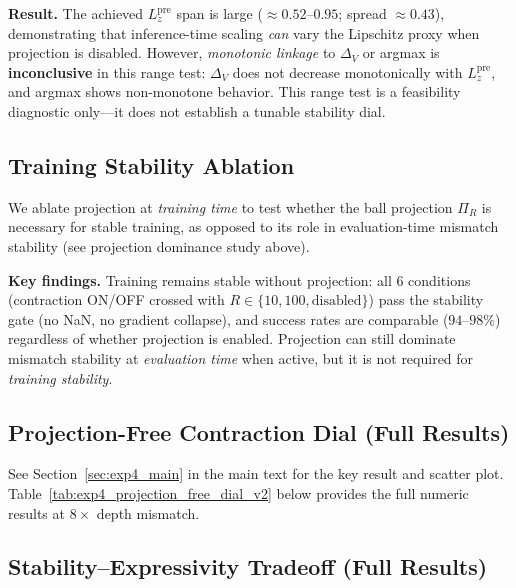 \documentclass{article}
\theoremstyle{plain}
\theoremstyle{definition}
\theoremstyle{remark}
\newcommand{\shortonly}[1]{#1}
\newcommand{\shortonly}[1]{}
\begin{document}


\textbf{Result.}
The achieved $L^{\mathrm{pre}}_z$ span is large ($\approx 0.52$--$0.95$; spread $\approx 0.43$), demonstrating that inference-time scaling \emph{can} vary the Lipschitz proxy when projection is disabled.
However, \emph{monotonic linkage} to $\Delta_V$ or argmax is \textbf{inconclusive} in this range test: $\Delta_V$ does not decrease monotonically with $L^{\mathrm{pre}}_z$, and argmax shows non-monotone behavior.
This range test is a feasibility diagnostic only---it does not establish a tunable stability dial.

\subsection{Training Stability Ablation}
\label{app:exp3_projection_ablation}

We ablate projection at \emph{training time} to test whether the ball projection $\Pi_R$ is necessary for stable training, as opposed to its role in evaluation-time mismatch stability (see projection dominance study above).



\textbf{Key findings.}
Training remains stable without projection: all 6 conditions (contraction ON/OFF crossed with $R\in\{10, 100, \text{disabled}\}$) pass the stability gate (no NaN, no gradient collapse), and success rates are comparable ($94$--$98\%$) regardless of whether projection is enabled.
Projection can still dominate mismatch stability at \emph{evaluation time} when active, but it is not required for \emph{training stability}.

\subsection{Projection-Free Contraction Dial (Full Results)}
\label{app:exp4_projection_free_dial_v2}

\shortonly{See Section~\ref{sec:exp4_main} in the main text for the key result and scatter plot.
Table~\ref{tab:exp4_projection_free_dial_v2} below provides the full numeric results at $8\times$ depth mismatch.

}

\subsection{Stability--Expressivity Tradeoff (Full Results)}
\label{app:exp5_tradeoff_curve}
\end{document}
